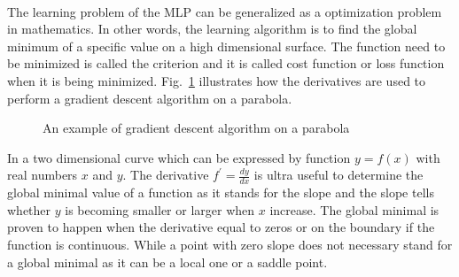 \paragraph{}
The learning problem of the MLP can be generalized as a optimization problem in mathematics.
In other words, the learning algorithm is to find the global minimum of a specific value on a high dimensional surface.
The function need to be minimized is called the criterion and it is called cost function or loss function when it is being minimized.
Fig.~\ref{lr_fig:ml_gradient_optimization} illustrates how the derivatives are used to perform a gradient descent algorithm on a parabola.
\begin{figure}
    \centering
    \caption[Example of gradient descent algorithm on a parabola]{An example of gradient descent algorithm on a parabola}
    \label{lr_fig:ml_gradient_optimization}
\end{figure}
%
In a two dimensional curve which can be expressed by function $y=f(x)$ with real numbers $x$ and $y$.
The derivative $f^\prime=\frac{dy}{dx}$ is ultra useful to determine the global minimal value of a function as it stands for the slope and the slope tells whether $y$ is becoming smaller or larger when $x$ increase.
The global minimal is proven to happen when the derivative equal to zeros or on the boundary if the function is continuous.
While a point with zero slope does not necessary stand for a global minimal as it can be a local one or a saddle point.
